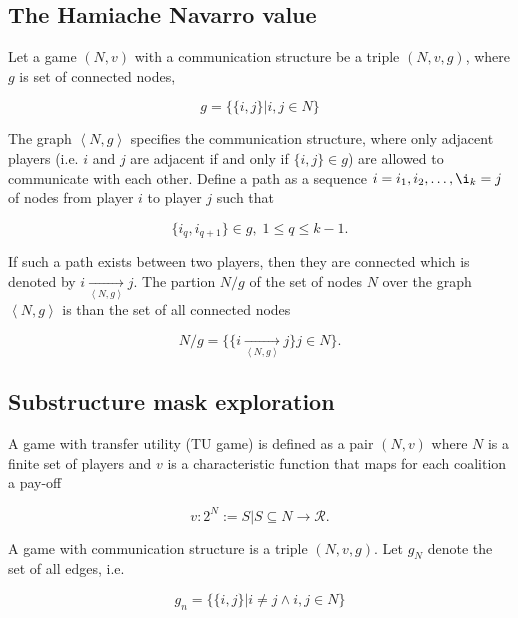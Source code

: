 \documentclass[twoside,twocolumn,9pt]{article}
\begin{document}
\subsection{The Hamiache Navarro value}

Let a game $(N, v)$ with a communication structure be a triple $(N, v, g)$, where $g$ is
set of connected nodes\cite{},

\begin{equation}
	g = \{ \{i, j \} | i, j \in N \}
\end{equation}

The graph $\left< N, g \right>$ specifies the communication structure, where only adjacent
players (i.e. $i$ and $j$ are adjacent if and only if $\{ i, j \} \in g$) are allowed to
communicate with each other. Define a path as a sequence $i = i_1, i_2, \dots, \i_k = j$
of nodes from player $i$ to player $j$ such that

\begin{equation}
	\{i_q, i_{q+1} \} \in g, \; 1 \le q \le k - 1.
\end{equation}

If such a path exists between two players, then they are connected which is denoted by
$i \underset{\left< N, g \right>}{\rightarrow} j$.\cite{} The partion $N/g$ of the set of
nodes $N$ over the graph $\left< N, g \right>$ is than the set of all connected nodes\cite{}

\begin{equation}
	N/g = \{ \{ i \underset{\left<N, g \right>}{\rightarrow} j \} j \in N \}.
\end{equation}


\subsection{Substructure mask exploration}




A game with transfer utility (TU game) is defined as a pair $(N, v)$ where $N$ is a finite
set of players and $v$ is a characteristic function that maps for each coalition a pay-off

\begin{equation}
	v: 2^N := {S | S \subseteq N} \rightarrow \mathcal{R}.
\end{equation}

A game with communication structure is a triple $(N, v, g)$.
Let $g_N$ denote the set of all edges, i.e.

\begin{equation}
	g_n  = \{\{ i, j \} | i \ne j \land i, j \in N \}
\end{equation}
\end{document}
